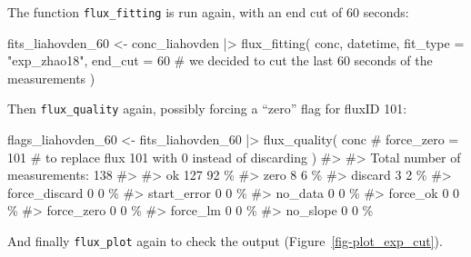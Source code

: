 \documentclass[
  letterpaper,
  DIV=11,
  numbers=noendperiod]{scrartcl}
\newenvironment{Shaded}{\begin{snugshade}}{\end{snugshade}}
\newcommand{\AttributeTok}[1]{\textcolor[rgb]{0.40,0.45,0.13}{#1}}
\newcommand{\CommentTok}[1]{\textcolor[rgb]{0.37,0.37,0.37}{#1}}
\newcommand{\DecValTok}[1]{\textcolor[rgb]{0.68,0.00,0.00}{#1}}
\newcommand{\FunctionTok}[1]{\textcolor[rgb]{0.28,0.35,0.67}{#1}}
\newcommand{\NormalTok}[1]{\textcolor[rgb]{0.00,0.23,0.31}{#1}}
\newcommand{\OtherTok}[1]{\textcolor[rgb]{0.00,0.23,0.31}{#1}}
\newcommand{\SpecialCharTok}[1]{\textcolor[rgb]{0.37,0.37,0.37}{#1}}
\newcommand{\StringTok}[1]{\textcolor[rgb]{0.13,0.47,0.30}{#1}}
\begin{document}
The function \texttt{flux\_fitting} is run again, with an end cut of 60
seconds:

\begin{Shaded}
\begin{Highlighting}[]
\NormalTok{fits\_liahovden\_60 }\OtherTok{\textless{}{-}}\NormalTok{ conc\_liahovden }\SpecialCharTok{|\textgreater{}}
  \FunctionTok{flux\_fitting}\NormalTok{(}
\NormalTok{    conc,}
\NormalTok{    datetime,}
    \AttributeTok{fit\_type =} \StringTok{"exp\_zhao18"}\NormalTok{,}
    \AttributeTok{end\_cut =} \DecValTok{60} \CommentTok{\# we decided to cut the last 60 seconds of the measurements}
\NormalTok{  )}
\end{Highlighting}
\end{Shaded}

Then \texttt{flux\_quality} again, possibly forcing a ``zero'' flag for
fluxID 101:

\begin{Shaded}
\begin{Highlighting}[]
\NormalTok{  flags\_liahovden\_60 }\OtherTok{\textless{}{-}}\NormalTok{ fits\_liahovden\_60 }\SpecialCharTok{|\textgreater{}}
    \FunctionTok{flux\_quality}\NormalTok{(}
\NormalTok{      conc}
      \CommentTok{\# force\_zero = 101 \# to replace flux 101 with 0 instead of discarding}
\NormalTok{    )}
\CommentTok{\#\textgreater{} }
\CommentTok{\#\textgreater{}  Total number of measurements: 138}
\CommentTok{\#\textgreater{} }
\CommentTok{\#\textgreater{}  ok   127     92 \%}
\CommentTok{\#\textgreater{}  zero     8   6 \%}
\CommentTok{\#\textgreater{}  discard      3   2 \%}
\CommentTok{\#\textgreater{}  force\_discard    0   0 \%}
\CommentTok{\#\textgreater{}  start\_error      0   0 \%}
\CommentTok{\#\textgreater{}  no\_data      0   0 \%}
\CommentTok{\#\textgreater{}  force\_ok     0   0 \%}
\CommentTok{\#\textgreater{}  force\_zero   0   0 \%}
\CommentTok{\#\textgreater{}  force\_lm     0   0 \%}
\CommentTok{\#\textgreater{}  no\_slope     0   0 \%}
\end{Highlighting}
\end{Shaded}

And finally \texttt{flux\_plot} again to check the output
(Figure~\ref{fig-plot_exp_cut}).
\end{document}
